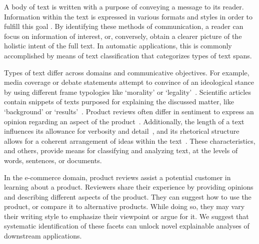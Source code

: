 



A body of text is written with a purpose of conveying a message to its reader.
Information within the text is expressed in various formats and styles in order to fulfill this goal \citep{levy1979CommunicativeGoals}.
By identifying these methods of communication, a reader can focus on information of interest, or, conversely, obtain a clearer picture of the holistic intent of the full text.
In automatic applications, this is commonly accomplished by means of text classification that categorizes types of text spans.

Types of text differ across domains and communicative objectives.
For example, media coverage or debate statements attempt to convince of an ideological stance by using different frame typologies like `morality' or `legality'~\citep{naderi2017newsFrames, ali2022framingSurvey}.
Scientific articles contain snippets of texts purposed for explaining the discussed matter, like `background' or `results'~\citep{dernoncourt2017pubmed, cohan2019articleClassification}.
Product reviews often differ in sentiment to express an opinion regarding an aspect of the product~\citep{serranoguerrero2015sentAna, Yadav2020sentAna}.
Additionally, the length of a text influences its allowance for verbosity and detail~\citep{louis2014summaryContent}, and its rhetorical structure allows for a coherent arrangement of ideas within the text~\citep{mann1988rst}.
These characteristics, and others, provide means for classifying and analyzing text, at the levels of words, sentences, or documents.

In the e-commerce domain, product reviews assist a potential customer in learning about a product.
Reviewers share their experience by providing opinions and describing different aspects of the product.
They can suggest how to use the product, or compare it to alternative products. 
While doing so, they may vary their writing style to emphasize their viewpoint or argue for it.
We suggest that systematic identification of these facets can unlock novel explainable analyses of downstream applications.

